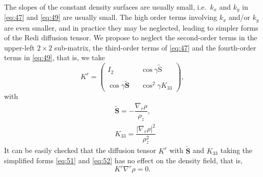 \documentclass[12pt]{report}
\def\tilde{\widetilde}
\def\bs{\boldsymbol}
\def\Sb{\bs{\mathrm{S}}}
\begin{document}
\\
The slopes of the constant density surfaces are usually small,
i.e.~$k_x$ and $k_y$ in \eqref{eq:47} and \eqref{eq:49} are usually
small.  The high order terms involving $k_x$ and/or $k_y$ are even
smaller, and in practice they may be neglected, leading to simpler forms
of the Redi diffusion tensor. We propose to neglect the second-order
terms in the upper-left $2\times 2$ sub-matrix, the third-order
terms of \eqref{eq:47} and the fourth-order terms in \eqref{eq:49},
that is, we take
\begin{equation}
  \label{eq:53}
  K^r = \left(\begin{matrix}
  I_2 & { } & \cos\gamma\tilde{\Sb}\\
\\
  \cos\gamma\tilde{\mathbf{S}} & { } & \cos^2\gamma K_{33}\end{matrix}\right), 
\end{equation}
with
\begin{align}
  &\tilde{\mathbf{S}} =
  -\dfrac{\nabla_r\rho}{\rho_z}, \label{eq:51}\\ 
   &K_{33} = \dfrac{|\nabla_r\rho|^2}{\rho_z^2}\label{eq:52}
 \end{align}
It can be easily checked that the diffusion tensor $K^r$ with
$\tilde{\mathbf{S}}$ and $K_{33}$ taking the simplified forms \eqref{eq:51}
and \eqref{eq:52} has no effect on the density field, that is,
\begin{displaymath}
  K^r\nabla^r\rho = 0.
\end{displaymath}
\end{document}

